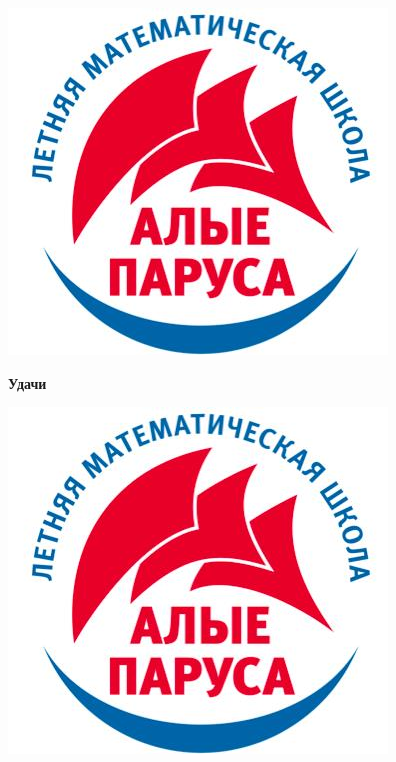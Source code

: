 \documentclass[12 pt, a4paper]{article}%
\begin{document}
\begin{figure}[b]
	\begin{minipage}[h]{0.33\linewidth}
		\includegraphics[width=0.33\linewidth, left]{logo.jpg}
	\end{minipage}
	\begin{minipage}[h]{0.33\linewidth}
		\centering
		\large{\textbf{Удачи \Winkey}}
	\end{minipage}
	\begin{minipage}[h]{0.33\linewidth}
		\includegraphics[width=0.33\linewidth, right]{logo.jpg}
	\end{minipage}
	\label{ris:image1}
\end{figure}

\end{document}
